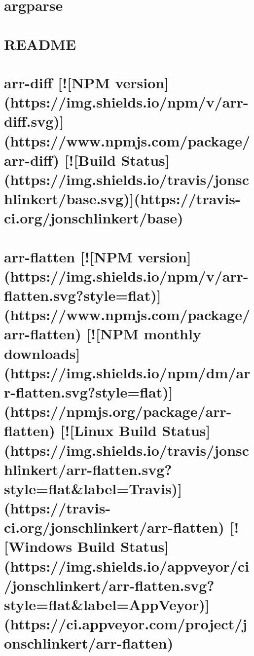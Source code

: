 \documentclass[twoside]{book}
\newcommand{\+}{\discretionary{\mbox{\scriptsize$\hookleftarrow$}}{}{}}
\begin{document}
\chapter{argparse}
\label{md__c_1_workspace_demo_src_main_script_node_modules_argparse__r_e_a_d_m_e}

\chapter{R\+E\+A\+D\+ME}
\label{md__c_1_workspace_demo_src_main_script_node_modules_aria-query__r_e_a_d_m_e}

\chapter{arr-\/diff \mbox{[}!\mbox{[}N\+PM version\mbox{]}(https\+://img.shields.\+io/npm/v/arr-\/diff.svg)\mbox{]}(https\+://www.npmjs.\+com/package/arr-\/diff) \mbox{[}!\mbox{[}Build Status\mbox{]}(https\+://img.shields.\+io/travis/jonschlinkert/base.svg)\mbox{]}(https\+://travis-\/ci.org/jonschlinkert/base)}
\label{md__c_1_workspace_demo_src_main_script_node_modules_arr-diff__r_e_a_d_m_e}

\chapter{arr-\/flatten \mbox{[}!\mbox{[}N\+PM version\mbox{]}(https\+://img.shields.\+io/npm/v/arr-\/flatten.svg?style=flat)\mbox{]}(https\+://www.npmjs.\+com/package/arr-\/flatten) \mbox{[}!\mbox{[}N\+PM monthly downloads\mbox{]}(https\+://img.shields.\+io/npm/dm/arr-\/flatten.svg?style=flat)\mbox{]}(https\+://npmjs.org/package/arr-\/flatten) \mbox{[}!\mbox{[}Linux Build Status\mbox{]}(https\+://img.shields.\+io/travis/jonschlinkert/arr-\/flatten.svg?style=flat\&label=Travis)\mbox{]}(https\+://travis-\/ci.org/jonschlinkert/arr-\/flatten) \mbox{[}!\mbox{[}Windows Build Status\mbox{]}(https\+://img.shields.\+io/appveyor/ci/jonschlinkert/arr-\/flatten.svg?style=flat\&label=App\+Veyor)\mbox{]}(https\+://ci.appveyor.\+com/project/jonschlinkert/arr-\/flatten)}
\label{md__c_1_workspace_demo_src_main_script_node_modules_arr-flatten__r_e_a_d_m_e}

\end{document}
